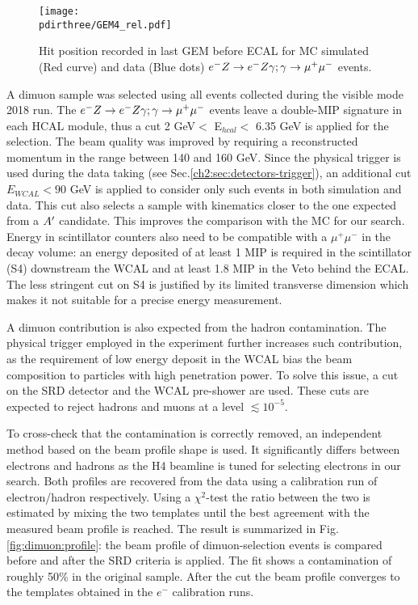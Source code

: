 \begin{figure}[tbh!]
  \begin{center}
    \texttt{[image: \\pdirthree/GEM4\_rel.pdf]}
  \end{center}
  \caption[Hit position of $\emu$ in GEM MC-DATA]{Hit position recorded in last GEM before ECAL for MC simulated (Red curve) and data (Blue dots) $\emu$ events.}
  \label{fig:dimuon:gemspectra}
\end{figure}
  

A dimuon sample was selected using all events collected during the visible mode 2018 run. The $\emu$ events leave a double-MIP signature in each HCAL module, thus a cut 2 GeV$<$ E$_{hcal} <$ 6.35 GeV is applied for the selection. The beam quality was improved by requiring a reconstructed momentum in the range between 140 and 160 GeV. Since the physical trigger is used during the data taking (see Sec.\ref{ch2:sec:detectors-trigger}), an additional cut $E_{WCAL} < 90$ GeV is applied to consider only such events in both simulation and data. This cut also selects a sample with kinematics closer to the one expected from a $A'$ candidate. This improves the comparison with the MC for our search. Energy in scintillator counters also need to be compatible with a $\mu^+ \mu^-$ in the decay volume: an energy deposited of at least 1 MIP is required in the scintillator (S4) downstream the WCAL and at least 1.8 MIP in the Veto behind the ECAL. 
The less stringent cut on S4 is justified by its limited transverse dimension which makes it not suitable for a precise energy measurement.

A dimuon contribution is also expected from the hadron contamination. The physical trigger employed in the experiment further increases such contribution, as the requirement of low energy deposit in the WCAL bias the beam composition to particles with high penetration power. To solve this issue, a cut on the SRD detector and the WCAL pre-shower are used. These cuts are expected to reject hadrons and muons at a level $\lesssim10^{-5}$.

To cross-check that the contamination is correctly removed, an independent method based on the beam profile shape is used. It significantly differs between electrons and hadrons as the H4 beamline is tuned for selecting electrons in our search. Both profiles are recovered from the data using a calibration run of electron/hadron respectively. Using a  $\chi^2$-test the ratio between the two is estimated by mixing the two templates until the best agreement with the measured beam profile is reached. The result is summarized in Fig.\ref{fig:dimuon:profile}: the beam profile of dimuon-selection events is compared before and after the SRD criteria is applied. The fit shows a contamination of roughly 50\% in the original sample. After the cut the beam profile converges to the templates obtained in the $e^-$ calibration runs.

